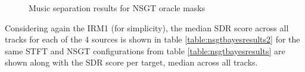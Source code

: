 \documentclass[report.tex]{subfiles}
\begin{document}
\begin{figure}[ht]
	\centering
{}
\caption{Music separation results for NSGT oracle masks}
\label{fig:nsgtboxplots}
\end{figure}

Considering again the IRM1 (for simplicity), the median SDR score across all tracks for each of the 4 sources is shown in table \ref{table:nsgtbayesresults2} for the same STFT and NSGT configurations from table \ref{table:nsgtbayesresults} are shown along with the SDR score per target, median across all tracks.
\end{document}
